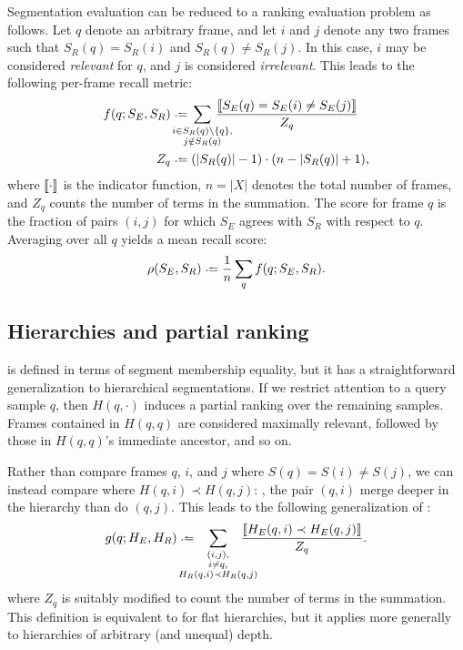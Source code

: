 \documentclass{article}
\begin{document}
Segmentation evaluation can be reduced to a ranking evaluation problem as follows.
Let $q$ denote an arbitrary frame, and let $i$ and $j$ denote any two frames such that $S_R(q) = S_R(i)$ and $S_R(q) \neq S_R(j)$.
In this case, $i$ may be considered \emph{relevant} for $q$, and $j$ is considered \emph{irrelevant}.
This leads to the following per-frame recall metric:
\begin{align}
f(q ; S_E, S_R) &\defeq  \hspace{-1.5em} \sum_{\substack{i \in S_R(q) \setminus \{q\},\\ j \notin S_R(q)}}
\hspace{-1.5em}\frac{\ind{S_E(q) = S_E(i) \neq S_E(j) }}{Z_q} \label{flatrecall}\\
Z_q &\defeq (|S_R(q)| - 1)\cdot (n - |S_R(q)| + 1), \notag
\end{align}
where $\left\llbracket\cdot\right\rrbracket$ is the indicator function, $n = |X|$ denotes the total number of frames, and $Z_q$
counts the number of terms in the summation.
The score for frame $q$ is the fraction of pairs $(i, j)$ for which $S_E$
agrees with $S_R$ with respect to $q$.
Averaging over all $q$ yields a mean recall score:
\begin{equation}
\rho(S_E, S_R) \defeq \frac{1}{n} \sum_q f(q ; S_E, S_R).\label{avgrecall}
\end{equation}


\subsection{Hierarchies and partial ranking}

 is defined in terms of segment membership equality, but it has a straightforward 
generalization to hierarchical segmentations.
If we restrict attention to a query sample $q$, then $H(q, \cdot)$ induces a partial ranking over the remaining samples.
Frames contained in $H(q, q)$ are considered maximally relevant, followed by those in $H(q, q)$'s immediate ancestor, and so on.

Rather than compare frames $q$, $i$, and $j$ where ${S(q) = S(i) \neq S(j)}$, we can instead compare where
$H(q, i) \prec H(q, j)$: \ie, the pair $(q,i)$ merge deeper in the hierarchy than do $(q,j)$.
This leads to the following generalization of :
\begin{equation}
    g(q ; H_E, H_R) \defeq \hspace{-1.5em} \sum_{\substack{(i, j),\\ i \neq q,\\ H_R(q, i) \prec H_R(q, j)}}
    \hspace{-1.5em} \frac{\ind{H_E(q, i) \prec H_E(q, j)}}{Z_q}.\label{hierrecall}
\end{equation}
where $Z_q$ is suitably modified to count the number of terms in the summation.
This definition is equivalent to  for flat hierarchies, but it applies more generally to 
hierarchies of arbitrary (and unequal) depth.
\end{document}
